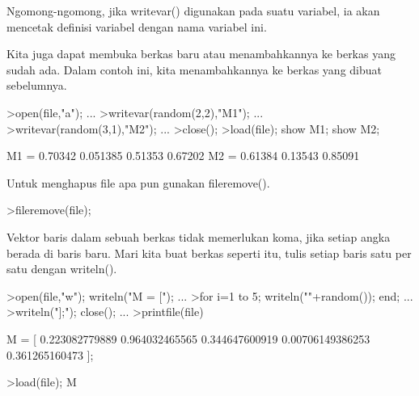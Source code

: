 \documentclass[a4paper,10pt]{article}
\begin{document}
\begin{eulernotebook}
\begin{eulercomment}
Ngomong-ngomong, jika writevar() digunakan pada suatu variabel, ia
akan mencetak definisi variabel dengan nama variabel ini.
\end{eulercomment}
\begin{eulercomment}
Kita juga dapat membuka berkas baru atau menambahkannya ke berkas yang
sudah ada. Dalam contoh ini, kita menambahkannya ke berkas yang dibuat
sebelumnya.
\end{eulercomment}
\begin{eulerprompt}
>open(file,"a"); ...
>writevar(random(2,2),"M1"); ...
>writevar(random(3,1),"M2"); ...
>close();
>load(file); show M1; show M2;
\end{eulerprompt}
\begin{euleroutput}
  M1 = 
    0.70342  0.051385 
    0.51353   0.67202 
  M2 = 
    0.61384 
    0.13543 
    0.85091 
\end{euleroutput}
\begin{eulercomment}
Untuk menghapus file apa pun gunakan fileremove().
\end{eulercomment}
\begin{eulerprompt}
>fileremove(file);
\end{eulerprompt}
\begin{eulercomment}
Vektor baris dalam sebuah berkas tidak memerlukan koma, jika setiap
angka berada di baris baru. Mari kita buat berkas seperti itu, tulis
setiap baris satu per satu dengan writeln().
\end{eulercomment}
\begin{eulerprompt}
>open(file,"w"); writeln("M = ["); ...
>for i=1 to 5; writeln(""+random()); end; ...
>writeln("];"); close(); ...
>printfile(file)
\end{eulerprompt}
\begin{euleroutput}
  M = [
  0.223082779889
  0.964032465565
  0.344647600919
  0.00706149386253
  0.361265160473
  ];
\end{euleroutput}
\begin{eulerprompt}
>load(file); M
\end{eulerprompt}
\begin{euleroutput}
  [0.22308,  0.96403,  0.34465,  0.0070615,  0.36127]
\end{euleroutput}
\end{eulernotebook}
\end{document}
